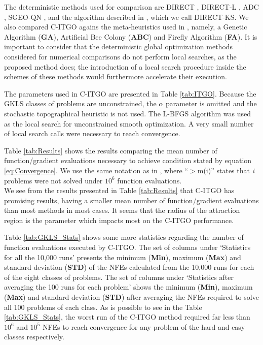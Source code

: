 The deterministic methods used for comparison are DIRECT \citep{DIRECT}, DIRECT-L \citep{DIRECTL}, ADC \citep{ADC}, SGEO-QN \citep{SGEO}, and the algorithm described in \cite{ADC2}, which we call DIRECT-KS. We also compared C-ITGO agains the meta-heuristics used in \cite{NAT}, namely, a Genetic Algorithm (\textbf{GA}), Artificial Bee Colony (\textbf{ABC}) and Firefly Algorithm (\textbf{FA}). It is important to consider that the deterministic global optimization methods considered for numerical comparisons do not perform local searches, as the proposed method does; the introduction of a local search procedure inside the schemes of these methods would furthermore accelerate their execution.

The parameters used in C-ITGO are presented in Table \ref{tab:ITGO}. Because the GKLS classes of problems are unconstrained, the $\alpha$ parameter is omitted and the stochastic topographical heuristic is not used. The L-BFGS algorithm was used as the local search for unconstrained smooth optimization. A very small number of local search calls were necessary to reach convergence.



Table \ref{tab:Results} shows the results comparing the mean number of function/gradient evaluations necessary to achieve condition stated by equation \ref{eq:Convergence}. We use the same notation as in \cite{NAT}, where “$>$m(i)” states that \textit{i} problems were not solved under $10^6$ function evaluations.\\




We see from the results presented in Table \ref{tab:Results} that C-ITGO has promising results, having a smaller mean number of function/gradient evaluations than most methods in most cases. It seems that the radius of the attraction region is the parameter which impacts most on the C-ITGO performance. 

Table \ref{tab:GKLS_Stats} shows some more statistics regarding the number of function evaluations executed by C-ITGO. The set of columns under `Statistics for all the 10,000 runs' presents the minimum (\textbf{Min}), maximum (\textbf{Max}) and standard deviation (\textbf{STD}) of the NFEs calculated from the 10,000 runs for each of the eight classes of problems. The set of columns under `Statistics after averaging the 100 runs for each problem' shows the minimum (\textbf{Min}), maximum (\textbf{Max}) and standard deviation (\textbf{STD}) after averaging the NFEs required to solve all 100 problems of each class. As is possible to see in the Table \ref{tab:GKLS_Stats}, the worst run of the C-ITGO method required far less than $10^6$ and $10^5$ NFEs to reach convergence for any problem of the hard and easy classes respectively.

